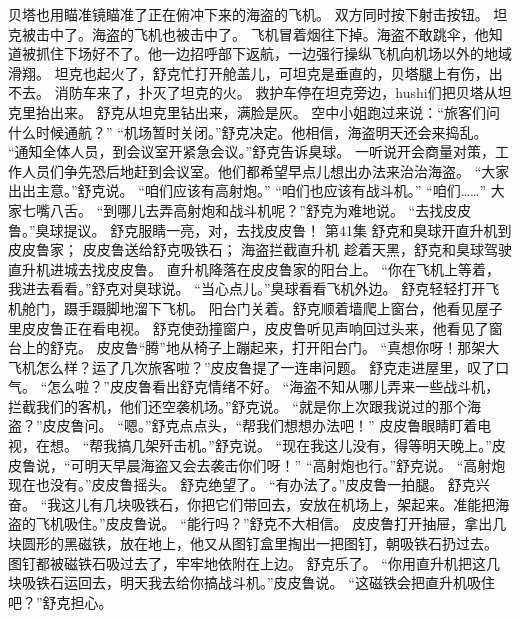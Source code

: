 \documentclass[a4paper,12pt,UTF8,twoside]{ctexbook}
\begin{document}
        贝塔也用瞄准镜瞄准了正在俯冲下来的海盗的飞机。 
        双方同时按下射击按钮。 
        坦克被击中了。海盗的飞机也被击中了。 
        飞机冒着烟往下掉。海盗不敢跳伞，他知道被抓住下场好不了。他一边招呼部下返航，一边强行操纵飞机向机场以外的地域滑翔。 
        坦克也起火了，舒克忙打开舱盖儿，可坦克是垂直的，贝塔腿上有伤，出不去。 
        消防车来了，扑灭了坦克的火。 
        救护车停在坦克旁边，hushi们把贝塔从坦克里抬出来。 
        舒克从坦克里钻出来，满脸是灰。 
        空中小姐跑过来说：“旅客们问什么时候通航？” 
        “机场暂时关闭。”舒克决定。他相信，海盗明天还会来捣乱。 
        “通知全体人员，到会议室开紧急会议。”舒克告诉臭球。 
        一听说开会商量对策，工作人员们争先恐后地赶到会议室。他们都希望早点儿想出办法来治治海盗。 
        “大家出出主意。”舒克说。 
        “咱们应该有高射炮。” 
        “咱们也应该有战斗机。” 
        “咱们……” 
        大家七嘴八舌。 
        “到哪儿去弄高射炮和战斗机呢？”舒克为难地说。 
        “去找皮皮鲁。”臭球提议。 
        舒克服睛一亮，对，去找皮皮鲁！   第41集 
        舒克和臭球开直升机到皮皮鲁家； 
        皮皮鲁送给舒克吸铁石； 
        海盗拦截直升机   
        趁着天黑，舒克和臭球驾驶直升机进城去找皮皮鲁。 
        直升机降落在皮皮鲁家的阳台上。 
        “你在飞机上等着，我进去看看。”舒克对臭球说。 
        “当心点儿。”臭球看看飞机外边。 
        舒克轻轻打开飞机舱门，蹑手蹑脚地溜下飞机。 
        阳台门关着。舒克顺着墙爬上窗台，他看见屋子里皮皮鲁正在看电视。 
        舒克使劲撞窗户，皮皮鲁听见声响回过头来，他看见了窗台上的舒克。 
        皮皮鲁“腾”地从椅子上蹦起来，打开阳台门。 
        “真想你呀！那架大飞机怎么样？运了几次旅客啦？”皮皮鲁提了一连串问题。 
        舒克走进屋里，叹了口气。 
        “怎么啦？”皮皮鲁看出舒克情绪不好。 
        “海盗不知从哪儿弄来一些战斗机，拦截我们的客机，他们还空袭机场。”舒克说。 
        “就是你上次跟我说过的那个海盗？”皮皮鲁问。 
        “嗯。”舒克点点头，“帮我们想想办法吧！” 
        皮皮鲁眼睛盯着电视，在想。 
        “帮我搞几架歼击机。”舒克说。 
        “现在我这儿没有，得等明天晚上。”皮皮鲁说，“可明天早晨海盗又会去袭击你们呀！” 
        “高射炮也行。”舒克说。 
        “高射炮现在也没有。”皮皮鲁摇头。 
        舒克绝望了。 
        “有办法了。”皮皮鲁一拍腿。 
        舒克兴奋。 
        “我这儿有几块吸铁石，你把它们带回去，安放在机场上，架起来。准能把海盗的飞机吸住。”皮皮鲁说。 
        “能行吗？”舒克不大相信。 
        皮皮鲁打开抽屉，拿出几块圆形的黑磁铁，放在地上，他又从图钉盒里掏出一把图钉，朝吸铁石扔过去。 
        图钉都被磁铁石吸过去了，牢牢地依附在上边。 
        舒克乐了。 
        “你用直升机把这几块吸铁石运回去，明天我去给你搞战斗机。”皮皮鲁说。 
        “这磁铁会把直升机吸住吧？”舒克担心。 
\end{document}
